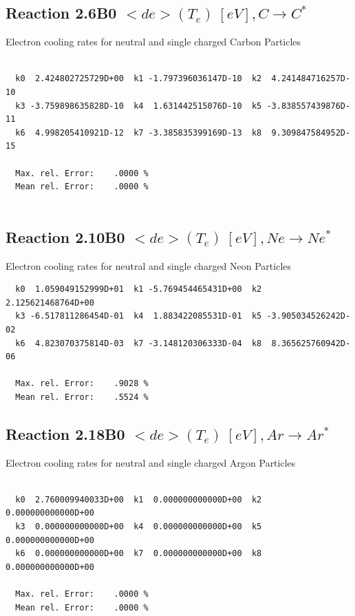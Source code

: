 \documentclass[12pt,dvips]{article}
\begin{document}
\subsection{
Reaction 2.6B0   $ <de>(T_e) \ [eV], C \rightarrow C^* $
}

 Electron cooling rates for neutral and single
 charged Carbon Particles

\begin{small}\begin{verbatim}

  k0  2.424802725729D+00  k1 -1.797396036147D-10  k2  4.241484716257D-10
  k3 -3.759898635828D-10  k4  1.631442515076D-10  k5 -3.838557439876D-11
  k6  4.998205410921D-12  k7 -3.385835399169D-13  k8  9.309847584952D-15

  Max. rel. Error:    .0000 %
  Mean rel. Error:    .0000 %


\end{verbatim}\end{small}

\subsection{
Reaction 2.10B0   $ <de>(T_e) \ [eV], Ne \rightarrow Ne^* $
}

 Electron cooling rates for neutral and single
 charged Neon Particles

\begin{small}\begin{verbatim}
  k0  1.059049152999D+01  k1 -5.769454465431D+00  k2  2.125621468764D+00
  k3 -6.517811286454D-01  k4  1.883422085531D-01  k5 -3.905034526242D-02
  k6  4.823070375814D-03  k7 -3.148120306333D-04  k8  8.365625760942D-06

  Max. rel. Error:    .9028 %
  Mean rel. Error:    .5524 %

\end{verbatim}\end{small}


\subsection{
Reaction 2.18B0  $  <de>(T_e) \ [eV], Ar \rightarrow Ar^*$
}

  Electron cooling rates for neutral and single
  charged Argon Particles

\begin{small}\begin{verbatim}

  k0  2.760009940033D+00  k1  0.000000000000D+00  k2  0.000000000000D+00
  k3  0.000000000000D+00  k4  0.000000000000D+00  k5  0.000000000000D+00
  k6  0.000000000000D+00  k7  0.000000000000D+00  k8  0.000000000000D+00

  Max. rel. Error:    .0000 %
  Mean rel. Error:    .0000 %

\end{verbatim}\end{small}
\end{document}
